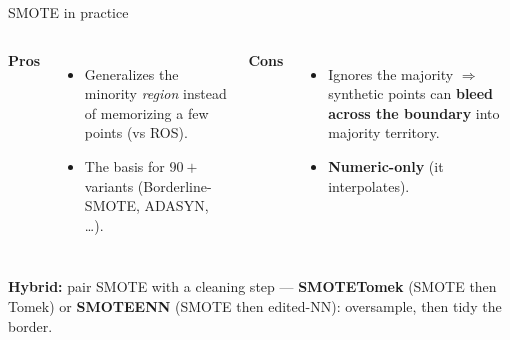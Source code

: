 \documentclass[aspectratio=169]{beamer}
\begin{document}

\begin{frame}{SMOTE in practice}
  \begin{columns}[T]
    \textcolor{paramgreen}{\textbf{Pros}}
    \begin{itemize}\small
      \item Generalizes the minority \emph{region} instead of memorizing a few points (vs ROS).
      \item The basis for $90{+}$ variants (Borderline-SMOTE, ADASYN, \dots).
    \end{itemize}
    \textcolor{armred}{\textbf{Cons}}
    \begin{itemize}\small
      \item Ignores the majority $\Rightarrow$ synthetic points can \textbf{bleed across the
        boundary} into majority territory.
      \item \textbf{Numeric-only} (it interpolates).
    \end{itemize}
  \end{columns}
  \vskip 4pt
  \footnotesize \textbf{Hybrid:} pair SMOTE with a cleaning step --- \textbf{SMOTETomek} (SMOTE
  then Tomek) or \textbf{SMOTEENN} (SMOTE then edited-NN): oversample, then tidy the border.
  \vfill
\end{frame}
\end{document}
